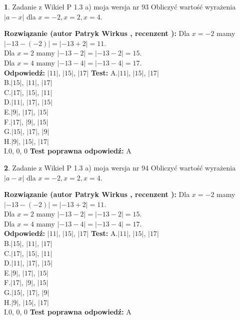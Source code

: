 \documentclass[12pt, a4paper]{article}
\theoremstyle{definition} %
\newtheorem{zad}{}
\newcommand{\zadStart}[1]{\begin{zad}#1\newline}
\newcommand{\zadStop}{\end{zad}}
\newcommand{\rozwStart}[2]{\noindent \textbf{Rozwiązanie (autor #1 , recenzent #2): }\newline}
\newcommand{\rozwStop}{\newline}
\newcommand{\odpStart}{\noindent \textbf{Odpowiedź:}\newline}
\newcommand{\odpStop}{\newline}
\newcommand{\testStart}{\noindent \textbf{Test:}\newline}
\newcommand{\testStop}{\newline}
\newcommand{\kluczStart}{\noindent \textbf{Test poprawna odpowiedź:}\newline}
\newcommand{\kluczStop}{\newline}
\begin{document}
\zadStart{Zadanie z Wikieł P 1.3 a) moja wersja nr 93}
Obliczyć wartość wyrażenia $|a - x|$ dla $x=-2,x=2,x=4$.
\zadStop
\rozwStart{Patryk Wirkus}{}
Dla $x = -2$ mamy $|-13 - (-2)| = |-13 + 2| = 11$.\\
Dla $x = 2$ mamy $|-13 - 2| = |-13 - 2| = 15$.\\
Dla $x = 4$ mamy $|-13 - 4| = |-13 - 4| = 17$.\\
\rozwStop
\odpStart
$|11|$, $|15|$, $|17|$
\odpStop
\testStart
A.$|11|$, $|15|$, $|17|$\\
B.$|15|$, $|11|$, $|17|$\\
C.$|17|$, $|15|$, $|11|$\\
D.$|11|$, $|17|$, $|15|$\\
E.$|9|$, $|17|$, $|15|$\\
F.$|17|$, $|9|$, $|15|$\\
G.$|15|$, $|17|$, $|9|$\\
H.$|9|$, $|15|$, $|17|$\\
I.$0$, $0$, $0$
\testStop
\kluczStart
A
\kluczStop



\zadStart{Zadanie z Wikieł P 1.3 a) moja wersja nr 94}
Obliczyć wartość wyrażenia $|a - x|$ dla $x=-2,x=2,x=4$.
\zadStop
\rozwStart{Patryk Wirkus}{}
Dla $x = -2$ mamy $|-13 - (-2)| = |-13 + 2| = 11$.\\
Dla $x = 2$ mamy $|-13 - 2| = |-13 - 2| = 15$.\\
Dla $x = 4$ mamy $|-13 - 4| = |-13 - 4| = 17$.\\
\rozwStop
\odpStart
$|11|$, $|15|$, $|17|$
\odpStop
\testStart
A.$|11|$, $|15|$, $|17|$\\
B.$|15|$, $|11|$, $|17|$\\
C.$|17|$, $|15|$, $|11|$\\
D.$|11|$, $|17|$, $|15|$\\
E.$|9|$, $|17|$, $|15|$\\
F.$|17|$, $|9|$, $|15|$\\
G.$|15|$, $|17|$, $|9|$\\
H.$|9|$, $|15|$, $|17|$\\
I.$0$, $0$, $0$
\testStop
\kluczStart
A
\kluczStop
\end{document}
